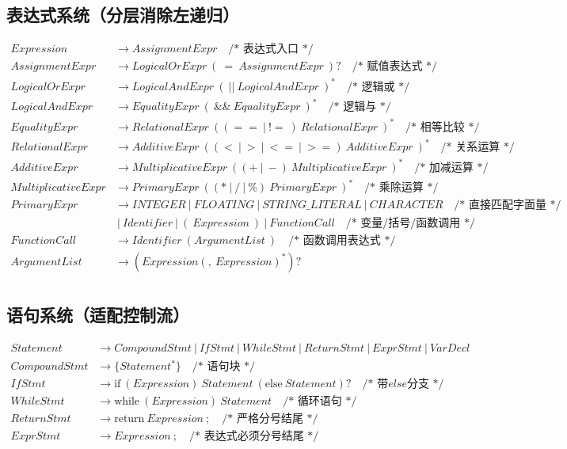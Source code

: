 \documentclass[11pt]{article}
\begin{document}
\subsection*{表达式系统（分层消除左递归）}
\begin{align*}
Expression &\rightarrow AssignmentExpr \quad \textit{/* 表达式入口 */} \\
AssignmentExpr &\rightarrow LogicalOrExpr\ (\ =\ AssignmentExpr\ )? \quad \textit{/* 赋值表达式 */} \\
LogicalOrExpr &\rightarrow LogicalAndExpr\ (\ ||\ LogicalAndExpr\ )^* \quad \textit{/* 逻辑或 */} \\
LogicalAndExpr &\rightarrow EqualityExpr\ (\ \&\&\ EqualityExpr\ )^* \quad \textit{/* 逻辑与 */} \\
EqualityExpr &\rightarrow RelationalExpr\ ( (==\ |\ !=\ )\ RelationalExpr\ )^* \quad \textit{/* 相等比较 */} \\
RelationalExpr &\rightarrow AdditiveExpr\ ( (<\ |\ >\ |\ <=\ |\ >= )\ AdditiveExpr\ )^* \quad \textit{/* 关系运算 */} \\
AdditiveExpr &\rightarrow MultiplicativeExpr\ ( (+\ |\ -)\ MultiplicativeExpr\ )^* \quad \textit{/* 加减运算 */} \\
MultiplicativeExpr &\rightarrow PrimaryExpr\ ( (*\ |\ /\ |\ \%)\ PrimaryExpr\ )^* \quad \textit{/* 乘除运算 */} \\
PrimaryExpr &\rightarrow INTEGER\ |\ FLOATING\ |\ STRING\_LITERAL\ |\ CHARACTER \quad \textit{/* 直接匹配字面量 */} \\
            &\ |\ Identifier\ |\ (\ Expression\ )\ |\ FunctionCall \quad \textit{/* 变量/括号/函数调用 */} \\
FunctionCall &\rightarrow Identifier\ ( ArgumentList\ ) \quad \textit{/* 函数调用表达式 */} \\
ArgumentList &\rightarrow (Expression(,\ Expression)^* )? \\
\end{align*}

\subsection*{语句系统（适配控制流）}
\begin{align*}
Statement &\rightarrow CompoundStmt\ |\ IfStmt\ |\ WhileStmt\ |\ ReturnStmt\ |\ ExprStmt\ |\ VarDecl \\
CompoundStmt &\rightarrow \{ Statement^* \} \quad \textit{/* 语句块 */} \\
IfStmt &\rightarrow \text{if}\ ( Expression )\ Statement\ (\text{else}\ Statement)? \quad \textit{/* 带else分支 */} \\
WhileStmt &\rightarrow \text{while}\ ( Expression )\ Statement \quad \textit{/* 循环语句 */} \\
ReturnStmt &\rightarrow \text{return}\ Expression\ ; \quad \textit{/* 严格分号结尾 */} \\
ExprStmt &\rightarrow Expression\ ; \quad \textit{/* 表达式必须分号结尾 */} \\
\end{align*}
\end{document}
